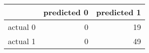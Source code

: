\begin{tabular}{lrr}
\toprule
{} & predicted 0 & predicted 1 \\
\midrule
actual 0 &           0 &          19 \\
actual 1 &           0 &          49 \\
\bottomrule
\end{tabular}
